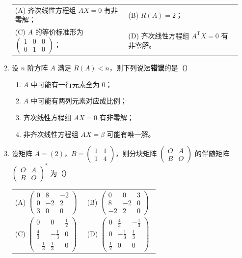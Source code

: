 \documentclass[UTF8,12pt]{ctexart}
\makeatletter
\newcommand{\choice}[4]{%
  \begin{tabular}{@{}p{0.48\linewidth}p{0.48\linewidth}@{}}
  (A) #1 & (B) #2\\[0.4em]
  (C) #3 & (D) #4
  \end{tabular}
}
\makeatother
\begin{document}
\begin{enumerate}[label={\arabic*、},leftmargin=2em,itemsep=0.8em]
\choice{齐次线性方程组 $AX=0$ 有非零解；}
{$R(A)=2$；}
{$A$ 的等价标准形为 $\begin{pmatrix}1&0&0\\0&1&0\end{pmatrix}$；}
{齐次线性方程组 $A^{\mathrm T}X=0$ 有非零解。}

\item 设 $n$ 阶方阵 $A$ 满足 $R(A)<n$，则下列说法\textbf{错误}的是（\quad）

\begin{enumerate}[label=(\Alph*),leftmargin=2em,itemsep=0.2em]
\item $A$ 中可能有一行元素全为 0；
\item $A$ 中可能有两列元素对应成比例；
\item 齐次线性方程组 $AX=0$ 有非零解；
\item 非齐次线性方程组 $AX=\beta$ 可能有唯一解。
\end{enumerate}

\newpage
\item 设矩阵 $A=(2)$，$B=\begin{pmatrix}1&1\\1&4\end{pmatrix}$，则分块矩阵
$\begin{pmatrix}O&A\\B&O\end{pmatrix}$ 的伴随矩阵
$\begin{pmatrix}O&A\\B&O\end{pmatrix}^{*}$ 为（\quad）

\begin{tabular}{@{}p{0.48\linewidth}p{0.48\linewidth}@{}}
(A) $\begin{pmatrix}0&8&-2\\0&-2&2\\3&0&0\end{pmatrix}$ &
(B) $\begin{pmatrix}0&0&3\\8&-2&0\\-2&2&0\end{pmatrix}$ \\[1.6em]
(C) $\begin{pmatrix}0&0&\frac12\\\frac43&-\frac13&0\\-\frac13&\frac13&0\end{pmatrix}$ &
(D) $\begin{pmatrix}0&\frac43&-\frac13\\0&-\frac13&\frac13\\\frac12&0&0\end{pmatrix}$
\end{tabular}
\end{enumerate}
\end{document}
